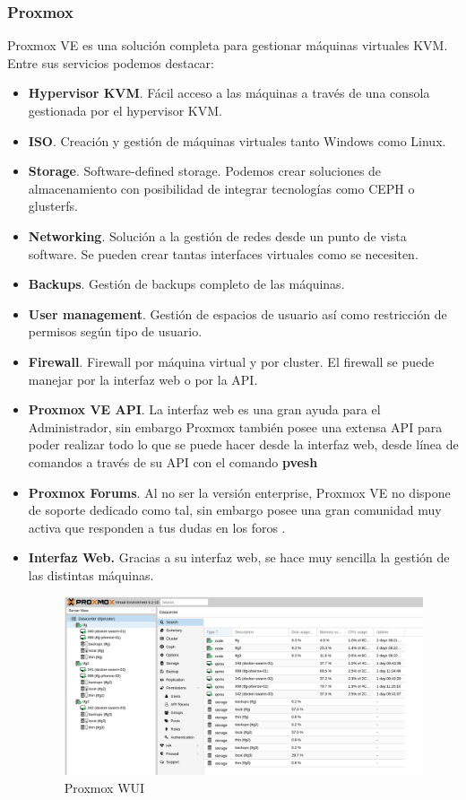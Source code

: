 		\subsubsection{Proxmox}
		\begin{text}
			Proxmox VE es una solución completa para gestionar máquinas virtuales KVM. Entre sus servicios podemos destacar:
			\begin{itemize}
				\item \textbf{Hypervisor KVM}. Fácil acceso a las máquinas a través de una consola gestionada por el hypervisor KVM.
				\item \textbf{ISO}. Creación y gestión de máquinas virtuales tanto Windows como Linux.
				\item \textbf{Storage}. Software-defined storage. Podemos crear soluciones de almacenamiento con posibilidad de integrar tecnologías como CEPH o glusterfs.
				\item \textbf{Networking}. Solución a la gestión de redes desde un punto de vista software. Se pueden crear tantas interfaces virtuales como se necesiten.
				\item \textbf{Backups}. Gestión de backups completo de las máquinas.
				\item \textbf{User management}. Gestión de espacios de usuario así como restricción de permisos según tipo de usuario.
				\item \textbf{Firewall}. Firewall por máquina virtual y por cluster. El firewall se puede manejar por la interfaz web o por la API.
				\item \textbf{Proxmox VE API}. La interfaz web es una gran ayuda para el Administrador, sin embargo Proxmox también posee una extensa API \cite{ProxmoxAPI:online} para poder realizar todo lo que se puede hacer desde la interfaz web, desde línea de comandos a través de su API con el comando \textbf{pvesh}
				\item \textbf{Proxmox Forums}. Al no ser la versión enterprise, Proxmox VE no dispone de soporte dedicado como tal, sin embargo posee una gran comunidad muy activa que responden a tus dudas en los foros \cite{ProxmoxForum:online}.
				\item \textbf{Interfaz Web.} Gracias a su interfaz web, se hace muy sencilla la gestión de las distintas máquinas.
				\begin{figure}[!hbt]
					\centering
					\includegraphics[scale=0.355]{imagenes/Diseno/proxmox_wui.png}
					\caption[Proxmox WUI]{Proxmox WUI} 
					\label{Proxmox WUI}
				\end{figure}
			\end{itemize}
 

\end{text}
